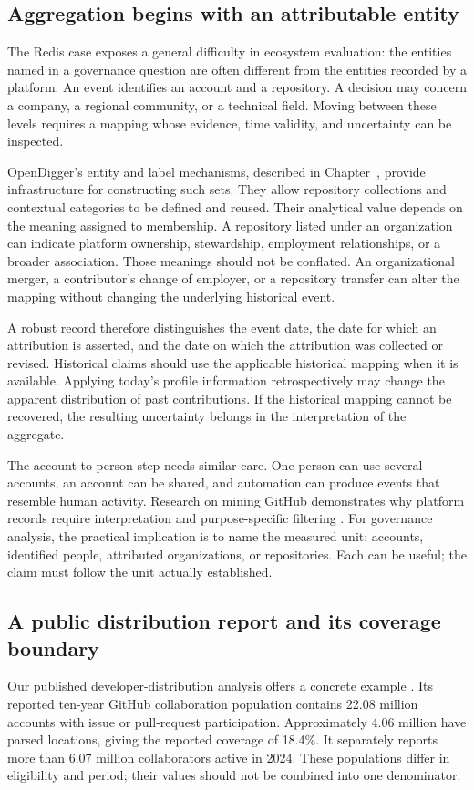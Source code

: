\subsection{Aggregation begins with an attributable entity}
The Redis case exposes a general difficulty in ecosystem evaluation: the entities named in a governance question are often different from the entities recorded by a platform. An event identifies an account and a repository. A decision may concern a company, a regional community, or a technical field. Moving between these levels requires a mapping whose evidence, time validity, and uncertainty can be inspected.

OpenDigger's entity and label mechanisms, described in Chapter~, provide infrastructure for constructing such sets. They allow repository collections and contextual categories to be defined and reused. Their analytical value depends on the meaning assigned to membership. A repository listed under an organization can indicate platform ownership, stewardship, employment relationships, or a broader association. Those meanings should not be conflated. An organizational merger, a contributor's change of employer, or a repository transfer can alter the mapping without changing the underlying historical event.

A robust record therefore distinguishes the event date, the date for which an attribution is asserted, and the date on which the attribution was collected or revised. Historical claims should use the applicable historical mapping when it is available. Applying today's profile information retrospectively may change the apparent distribution of past contributions. If the historical mapping cannot be recovered, the resulting uncertainty belongs in the interpretation of the aggregate.

The account-to-person step needs similar care. One person can use several accounts, an account can be shared, and automation can produce events that resemble human activity. Research on mining GitHub demonstrates why platform records require interpretation and purpose-specific filtering \citep{kalliamvakou2014}. For governance analysis, the practical implication is to name the measured unit: accounts, identified people, attributed organizations, or repositories. Each can be useful; the claim must follow the unit actually established.

\subsection{A public distribution report and its coverage boundary}
Our published developer-distribution analysis offers a concrete example \citep{zhao2025geography}. Its reported ten-year GitHub collaboration population contains 22.08 million accounts with issue or pull-request participation. Approximately 4.06 million have parsed locations, giving the reported coverage of 18.4\%. It separately reports more than 6.07 million collaborators active in 2024. These populations differ in eligibility and period; their values should not be combined into one denominator.

